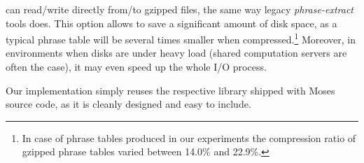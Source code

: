 \Eppex{} can read/write directly from/to gzipped files, the same way legacy \emph{phrase-extract}
tools does.
This option allows to save a significant amount of disk space, as a typical phrase table will be
several times smaller when compressed.\footnote{In case of phrase tables produced in our experiments
the compression ratio of gzipped phrase tables varied between 14.0\% and 22.9\%.}
Moreover, in environments when disks are under heavy load (shared computation servers are often
the case), it may even speed up the whole I/O process.

Our implementation simply reuses the respective library shipped with Moses source code,
as it is cleanly designed and easy to include.

